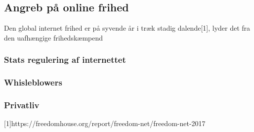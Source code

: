 \subsection{Angreb på online frihed}
Den global internet frihed er på syvende år i træk stadig dalende[1], lyder det fra den uafhængige frihedskæmpend

\subsubsection{Stats regulering af internettet}

\subsubsection{Whisleblowers}

\subsubsection{Privatliv}

[1]https://freedomhouse.org/report/freedom-net/freedom-net-2017